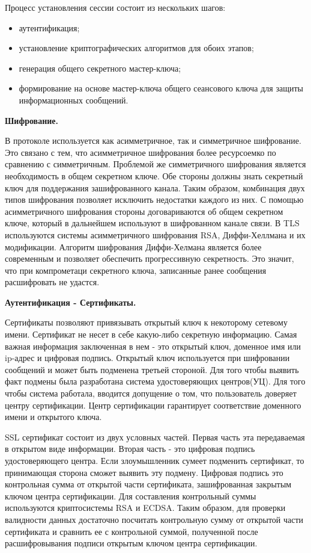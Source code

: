 Процесс установления сессии состоит из нескольких шагов:
\begin{itemize}
	\item аутентификация;
	\item установление криптографических алгоритмов для обоих этапов;
	\item генерация общего секретного мастер-ключа;
	\item формирование на основе мастер-ключа общего сеансового ключа для защиты информационных сообщений.
\end{itemize}

\textbf{Шифрование.}

В протоколе используется как асимметричное, так и симметричное шифрование. Это связано с тем, что асимметричное шифрования более ресурсоемко по сравнению с симметричным. Проблемой же симметричного шифрования является необходимость в общем секретном ключе. Обе стороны должны знать секретный ключ для поддержания зашифрованного канала. Таким образом, комбинация двух типов шифрования позволяет исключить недостатки каждого из них. С помощью асимметричного шифрования стороны договариваются об общем секретном ключе, который в дальнейшем используют в шифрованном канале связи. В TLS используются системы асимметричного шифрования RSA, Диффи-Хеллмана и их модификации. Алгоритм шифрования Диффи-Хелмана является более современным и позволяет обеспечить прогрессивную секретность. Это значит, что при компрометаци секретного ключа, записанные ранее сообщения расшифровать не удастся.

\textbf{Аутентификация - Сертификаты.}

Сертификаты позволяют привязывать открытый ключ к некоторому сетевому имени. Сертификат не несет в себе какую-либо секретную информацию. Самая важная информация заключенная в нем - это открытый ключ, доменное имя или ip-адрес и цифровая подпись. Открытый ключ используется при шифровании сообщений и может быть подменена третьей стороной. Для того чтобы выявить факт подмены была разработана система удостоверяющих центров(УЦ). Для того чтобы система работала, вводится допущение о том, что пользователь доверяет центру сертификации. Центр сертификации гарантирует соответствие доменного имени и открытого ключа.

SSL сертификат состоит из двух условных частей. Первая часть эта передаваемая в открытом виде информации. Вторая часть - это цифровая подпись удостоверяющего центра. Если злоумышленник сумеет подменить сертификат, то принимающая сторона сможет выявить эту подмену. Цифровая подпись это контрольная сумма от открытой части сертификата, зашифрованная закрытым ключом центра сертификации. Для составления контрольный суммы используются криптосистемы RSA и ECDSA. Таким образом, для проверки валидности данных достаточно посчитать контрольную сумму от открытой части сертификата и сравнить ее с контрольной суммой, полученной после расшифровывания подписи открытым ключом центра сертификации.

